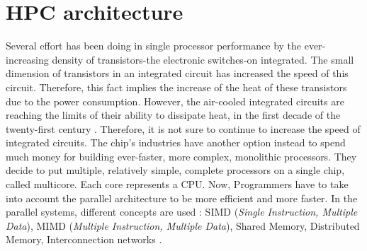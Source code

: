 \section{HPC architecture}
Several effort has been doing in single processor performance by the ever-increasing density of transistors-the electronic switches-on integrated. The small dimension of transistors in an integrated circuit has increased the speed of this circuit. Therefore, this fact implies the increase of the heat of these transistors due to the power consumption. However, the air-cooled integrated circuits are reaching the limits of their ability to dissipate heat, in the first decade of the twenty-first century \cite{Hager2010}. 
Therefore, it is not sure to continue to increase the speed of integrated circuits. The chip's industries have another option instead to spend much money for building ever-faster, more complex, monolithic
processors. They decide to put multiple, relatively simple, complete processors on a single chip, called multicore. Each core represents a CPU. Now, Programmers have to take into account the parallel architecture to be more efficient and more faster. 
In the parallel systems, different concepts are used  : SIMD (\textit{Single Instruction, Multiple Data}), MIMD (\textit{Multiple Instruction, Multiple Data}), Shared Memory, Distributed Memory, Interconnection networks \cite{Hager2010}. 

